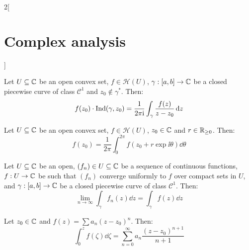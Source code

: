 \documentclass[../../../main.tex]{subfiles}
\begin{document}
\begin{multicols}{2}[\section{Complex analysis}]
\begin{theorem}
  \end{theorem}
  \begin{theorem}
    Let $U\subseteq\mathbb{C}$ be an open convex set, $f\in\mathcal{H}(U)$, $\gamma:[a,b]\rightarrow\mathbb{C}$ be a closed piecewise curve of class $\mathcal{C}^1$ and $z_0\notin\gamma^*$. Then:
    $$f(z_0)\cdot\operatorname{Ind}(\gamma,z_0)=\frac{1}{2\pi\mathrm{i}}\int_\gamma\frac{f(z)}{z-z_0}\dd{z}$$
  \end{theorem}
  \begin{corollary}
    Let $U\subseteq\mathbb{C}$ be an open convex set, $f\in\mathcal{H}(U)$, $z_0\in\mathbb{C}$ and $r\in\mathbb{R}_{\geq 0}$. Then:
    $$f(z_0)=\frac{1}{2\pi}\int_0^{2\pi}f(z_0+r\exp{\ii\theta})\dd{\theta}$$
  \end{corollary}
  \begin{lemma}
    Let $U\subseteq\mathbb{C}$ be an open, $(f_n)\in U\subseteq\mathbb{C}$ be a sequence of continuous functions, $f:U\rightarrow\mathbb{C}$ be such that $(f_n)$ converge uniformly to $f$ over compact sets in $U$, and $\gamma:[a,b]\rightarrow\mathbb{C}$ be a closed piecewise curve of class $\mathcal{C}^1$. Then:
    $$\lim_{n\to\infty}\int_\gamma f_n(z)\dd{z}=\int_\gamma f(z)\dd{z}$$
  \end{lemma}
  \begin{corollary}
    Let $z_0\in\mathbb{C}$ and $f(z)=\sum a_n{(z-z_0)}^n$. Then:
    $$\int_0^z f(\zeta)\dd{\zeta}=\sum_{n=0}^\infty a_n\frac{{(z-z_0)}^{n+1}}{n+1}$$
  \end{corollary}

\end{multicols}
\end{document}
